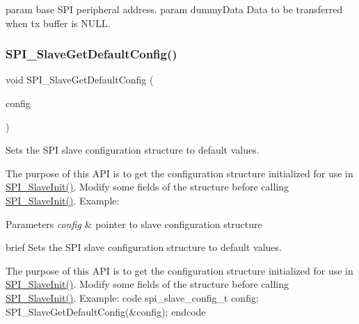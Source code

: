 param base S\+PI peripheral address. param dummy\+Data Data to be transferred when tx buffer is N\+U\+LL. \mbox{\label{group__spi__driver_gac000b63ed033f57a9eee342a8c8e67f2}} 
\subsubsection{\texorpdfstring{SPI\_SlaveGetDefaultConfig()}{SPI\_SlaveGetDefaultConfig()}}
{\footnotesize\ttfamily void S\+P\+I\+\_\+\+Slave\+Get\+Default\+Config (\begin{DoxyParamCaption}\item[{\mbox{\hyperlink{group__spi__driver_gaa62352a5d0a01f70fe74941809d03ec3}{spi\+\_\+slave\+\_\+config\+\_\+t}} $\ast$}]{config }\end{DoxyParamCaption})}



Sets the S\+PI slave configuration structure to default values. 

The purpose of this A\+PI is to get the configuration structure initialized for use in \mbox{\hyperlink{group__spi__driver_ga91b214b5392fc8d5b73a5ebadc5ca363}{S\+P\+I\+\_\+\+Slave\+Init()}}. Modify some fields of the structure before calling \mbox{\hyperlink{group__spi__driver_ga91b214b5392fc8d5b73a5ebadc5ca363}{S\+P\+I\+\_\+\+Slave\+Init()}}. Example\+: 
\begin{DoxyCode}{0}
\end{DoxyCode}



\begin{DoxyParams}{Parameters}
{\em config} & pointer to slave configuration structure\\
\hline
\end{DoxyParams}
brief Sets the S\+PI slave configuration structure to default values.

The purpose of this A\+PI is to get the configuration structure initialized for use in \mbox{\hyperlink{group__spi__driver_ga91b214b5392fc8d5b73a5ebadc5ca363}{S\+P\+I\+\_\+\+Slave\+Init()}}. Modify some fields of the structure before calling \mbox{\hyperlink{group__spi__driver_ga91b214b5392fc8d5b73a5ebadc5ca363}{S\+P\+I\+\_\+\+Slave\+Init()}}. Example\+: code spi\+\_\+slave\+\_\+config\+\_\+t config; S\+P\+I\+\_\+\+Slave\+Get\+Default\+Config(\&config); endcode

